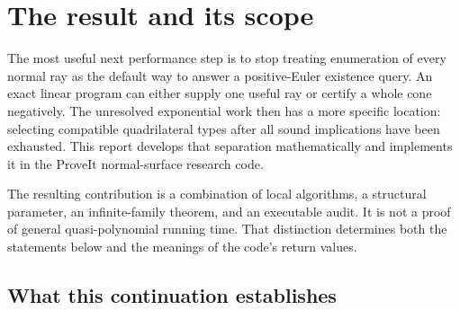 \section{The result and its scope}\label{sec:overview}

The most useful next performance step is to stop treating enumeration of every normal ray as the default way to answer a positive-Euler existence query. An exact linear program can either supply one useful ray or certify a whole cone negatively. The unresolved exponential work then has a more specific location: selecting compatible quadrilateral types after all sound implications have been exhausted. This report develops that separation mathematically and implements it in the ProveIt normal-surface research code.

The resulting contribution is a combination of local algorithms, a structural parameter, an infinite-family theorem, and an executable audit. It is not a proof of general quasi-polynomial running time. That distinction determines both the statements below and the meanings of the code's return values.

\subsection{What this continuation establishes}

